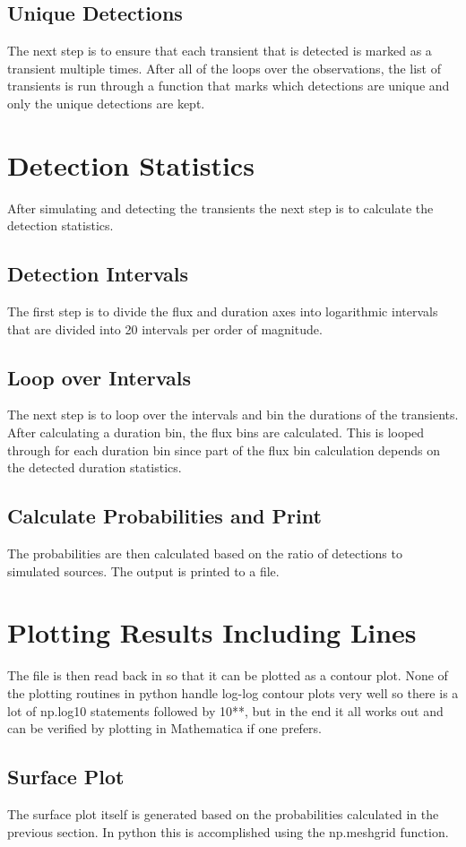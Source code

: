 \documentclass{article}
\begin{document}
\subsection{Unique Detections}
The next step is to ensure that each transient that is detected is marked as a transient multiple times. After all of the loops over the observations, the list of transients is run through a function that marks which detections are unique and only the unique detections are kept.

\section{Detection Statistics}
After simulating and detecting the transients the next step is to calculate the detection statistics. 

\subsection{Detection Intervals}
The first step is to divide the flux and duration axes into logarithmic intervals that are divided into 20 intervals per order of magnitude. 
\subsection{Loop over Intervals}
The next step is to loop over the intervals and bin the durations of the transients. After calculating a duration bin, the flux bins are calculated. This is looped through for each duration bin since part of the flux bin calculation depends on the detected duration statistics. 
\subsection{Calculate Probabilities and Print}
The probabilities are then calculated based on the ratio of detections to simulated sources. The output is printed to a file.

\section{Plotting Results Including Lines}
The file is then read back in so that it can be plotted as a contour plot. None of the plotting routines in python handle log-log contour plots very well so there is a lot of np.log10 statements followed by 10**, but in the end it all works out and can be verified by plotting in Mathematica if one prefers. 
\subsection{Surface Plot}
The surface plot itself is generated based on the probabilities calculated in the previous section. In python this is accomplished using the np.meshgrid function. 
\end{document}
